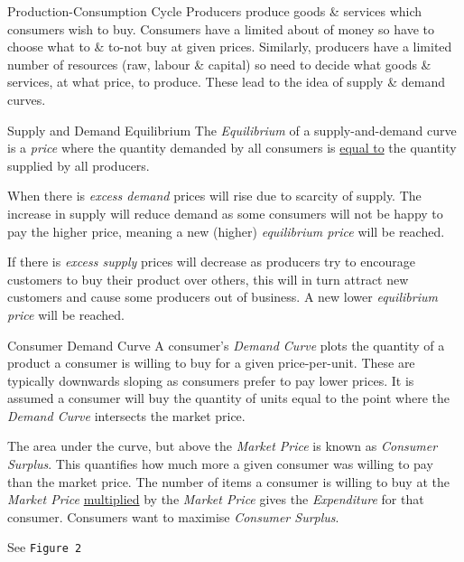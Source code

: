 \documentclass[11pt,a4paper]{article}
\begin{document}
\begin{definition}{Production-Consumption Cycle}
  Producers produce goods \& services which consumers wish to buy. Consumers have a limited about of money so have to choose what to \& to-not buy at given prices. Similarly, producers have a limited number of resources (raw, labour \& capital) so need to decide what goods \& services, at what price, to produce. These lead to the idea of supply \& demand curves.
\end{definition}

\begin{definition}{Supply and Demand Equilibrium}
  The \textit{Equilibrium} of a supply-and-demand curve is a \textit{price} where the quantity demanded by all consumers is \underline{equal to} the quantity supplied by all producers.
  \par When there is \textit{excess demand} prices will rise due to scarcity of supply. The increase in supply will reduce demand as some consumers will not be happy to pay the higher price, meaning a new (higher) \textit{equilibrium price} will be reached.
  \par If there is \textit{excess supply} prices will decrease as producers try to encourage customers to buy their product over others, this will in turn attract new customers and cause some producers out of business. A new lower \textit{equilibrium price} will be reached.
\end{definition}

\begin{definition}{Consumer Demand Curve}
  A consumer's \textit{Demand Curve} plots the quantity of a product a consumer is willing to buy for a given price-per-unit. These are typically downwards sloping as consumers prefer to pay lower prices. It is assumed a consumer will buy the quantity of units equal to the point where the \textit{Demand Curve} intersects the market price.

  \par The area under the curve, but above the \textit{Market Price} is known as \textit{Consumer Surplus}. This quantifies how much more a given consumer was willing to pay than the market price. The number of items a consumer is willing to buy at the \textit{Market Price} \underline{multiplied} by the \textit{Market Price} gives the \textit{Expenditure} for that consumer. Consumers want to maximise \textit{Consumer Surplus}.

  \par See \texttt{Figure 2}
\end{definition}
\end{document}
